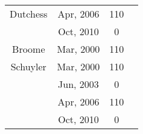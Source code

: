 \documentclass[12pt]{article}
\begin{document}
\begin{table}
\begin{tabular}{|c|c|c|c|}
	Dutchess	& Apr, 2006  & 110   &    \\ 
				& Oct, 2010  & 0  & \\ \hline 
	Broome 		& Mar, 2000  &  110  &   \\ \hline
	Schuyler	& Mar, 2000  &  110   &  \\ 
				& Jun, 2003  & 0     & \\ 
				& Apr, 2006  & 110   &    \\ 
				& Oct, 2010  & 0  & \\ \hline 

\end{tabular} 
\end{table}
\end{document}
